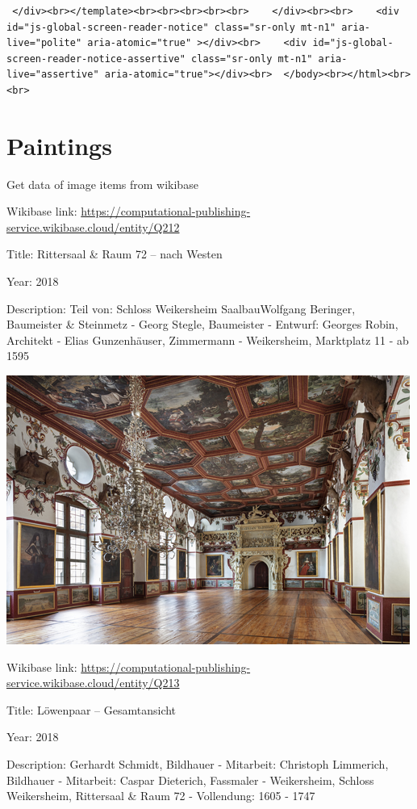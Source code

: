 \documentclass[
  letterpaper,
]{book}
\begin{document}
\begin{verbatim}
 </div><br></template><br><br><br><br><br>    </div><br><br>    <div id="js-global-screen-reader-notice" class="sr-only mt-n1" aria-live="polite" aria-atomic="true" ></div><br>    <div id="js-global-screen-reader-notice-assertive" class="sr-only mt-n1" aria-live="assertive" aria-atomic="true"></div><br>  </body><br></html><br><br>
\end{verbatim}


\chapter{Paintings}\label{paintings}

Get data of image items from wikibase

Wikibase link:
\url{https://computational-publishing-service.wikibase.cloud/entity/Q212}

Title: Rittersaal \& Raum 72 -- nach Westen

Year: 2018

Description: Teil von: Schloss Weikersheim SaalbauWolfgang Beringer,
Baumeister \& Steinmetz - Georg Stegle, Baumeister - Entwurf: Georges
Robin, Architekt - Elias Gunzenhäuser, Zimmermann - Weikersheim,
Marktplatz 11 - ab 1595

\includegraphics{paintings_files/figure-pdf/cell-3-output-2.png}

Wikibase link:
\url{https://computational-publishing-service.wikibase.cloud/entity/Q213}

Title: Löwenpaar -- Gesamtansicht

Year: 2018

Description: Gerhardt Schmidt, Bildhauer - Mitarbeit: Christoph
Limmerich, Bildhauer - Mitarbeit: Caspar Dieterich, Fassmaler -
Weikersheim, Schloss Weikersheim, Rittersaal \& Raum 72 - Vollendung:
1605 - 1747
\end{document}
